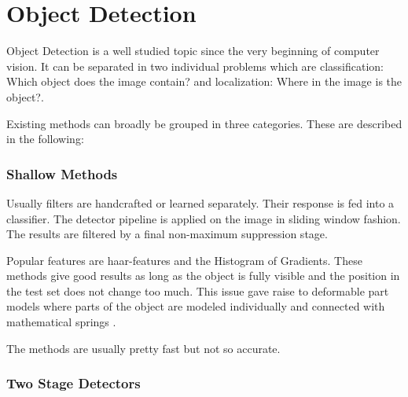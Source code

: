 
	
	
	\section{Object Detection}
	\label{sec:bg:object_detection}
	Object Detection is a well studied topic since the very beginning of computer vision. It can be separated in two individual problems which are classification: Which object does the image contain? and localization: Where in the image is the object?.
	
	Existing methods can broadly be grouped in three categories. These are described in the following:

	\subsubsection{Shallow Methods}
	
	Usually filters are handcrafted or learned separately. Their response is fed into a classifier. The detector pipeline is applied on the image in sliding window fashion. The results are filtered by a final non-maximum suppression stage. 
	
	Popular features are haar-features \cite{Viola2004} and the Histogram of Gradients\cite{Forsyth}. These methods give good results as long as the object is fully visible and the position in the test set does not change too much. This issue gave raise to deformable part models where parts of the object are modeled individually and connected with mathematical springs \cite{Viola2004}.
	
	The methods are usually pretty fast but not so accurate.
	
	\subsubsection{Two Stage Detectors}
	
